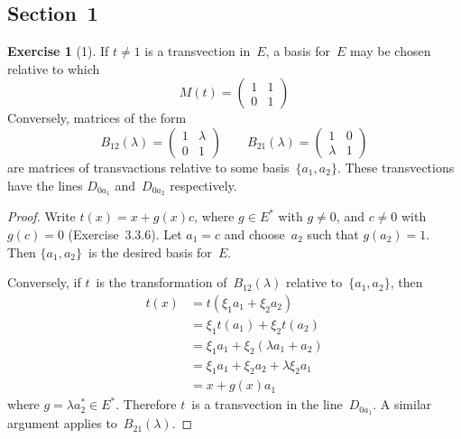 \documentclass[letterpaper,12pt]{article}
\newcommand{\dual}[1]{#1^*}
\theoremstyle{definition}
\newtheorem*{exer}{Exercise}
\theoremstyle{remark}
\begin{document}
\subsection*{Section~1}
\begin{exer}[1]
If \(t\ne1\) is a transvection in~\(E\), a basis for~\(E\) may be chosen relative to which
\[M(t)=\begin{pmatrix}
1&1\\
0&1
\end{pmatrix}\]
Conversely, matrices of the form
\[B_{12}(\lambda)=\begin{pmatrix}
1&\lambda\\
0&1
\end{pmatrix}
\qquad
B_{21}(\lambda)=\begin{pmatrix}
1&0\\
\lambda&1
\end{pmatrix}\]
are matrices of transvactions relative to some basis~\(\{a_1,a_2\}\). These transvections have the lines \(D_{0a_1}\) and~\(D_{0a_2}\) respectively.
\end{exer}
\begin{proof}
Write \(t(x)=x+g(x)c\), where \(g\in\dual{E}\) with \(g\ne 0\), and \(c\ne 0\) with \(g(c)=0\) (Exercise~3.3.6). Let \(a_1=c\) and choose~\(a_2\) such that \(g(a_2)=1\). Then \(\{a_1,a_2\}\)~is the desired basis for~\(E\).

Conversely, if \(t\)~is the transformation of~\(B_{12}(\lambda)\) relative to~\(\{a_1,a_2\}\), then
\begin{align*}
t(x)&=t(\xi_1a_1+\xi_2a_2)\\
	&=\xi_1 t(a_1)+\xi_2 t(a_2)\\
	&=\xi_1 a_1+\xi_2(\lambda a_1+a_2)\\
	&=\xi_1 a_1+\xi_2 a_2+\lambda\xi_2 a_1\\
	&=x+g(x)a_1
\end{align*}
where \(g=\lambda\dual{a_2}\in\dual{E}\). Therefore \(t\)~is a transvection in the line~\(D_{0a_1}\). A similar argument applies to~\(B_{21}(\lambda)\).
\end{proof}
\end{document}
